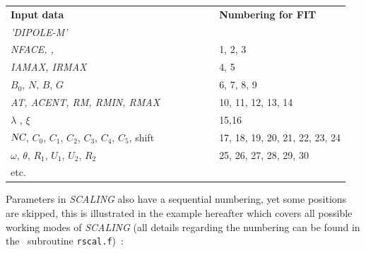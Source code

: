 \begin{center}
{\renewcommand{\arraystretch}{1}
	\begin{tabular}{lcl}
	\textbf{Input  data}  &~~~~~~~~&  \textbf{Numbering  for  FIT}\\
      \textsl{'DIPOLE-M'}                      \\
	\textsl{NFACE,  \IC,  \IL}     &  &  1, 2, 3 \\
	\textsl{IAMAX,  IRMAX}         &&  4, 5    \\
	$B_0$, $N$, $B$, $G$  &&  6, 7, 8, 9\\
	\textsl{AT, ACENT, RM, RMIN, RMAX} &&  10, 11, 12, 13, 14 \\
	$\lambda$ , $\xi$     &&  15,16    \\
	$\textsl{NC}$, $C_0$, $C_1$, $C_2$, $C_3$, $C_4$, $C_5$, shift
	                      &&  17, 18, 19, 20, 21, 22, 23, 24\\
	$\omega$, $\theta$, $R_1$, $U_1$, $U_2$, $R_2$ 
	                      && 25, 26, 27, 28, 29, 30 \\
	etc.                 && 
	\end{tabular}   }
\end{center}



\noindent Parameters in \textsl{SCALING} also have a sequential numbering, yet some positions 
are skipped, this is illustrated in the example hereafter which covers all possible working modes of \textsl{SCALING} 
 (all details regarding the numbering can be found in the \FORTRAN\ subroutine \texttt{rscal.f})~: 

